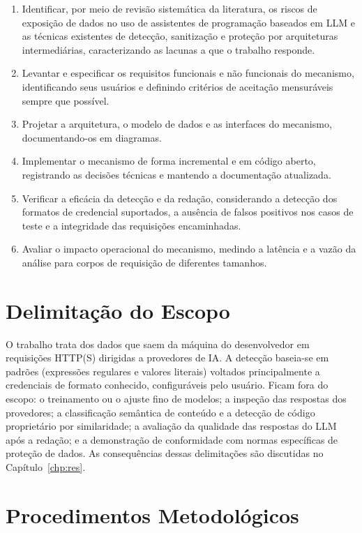 \begin{enumerate}
    \item[\textbf{OE1.}] Identificar, por meio de revisão sistemática da literatura, os riscos de exposição de dados no uso de assistentes de programação baseados em LLM e as técnicas existentes de detecção, sanitização e proteção por arquiteturas intermediárias, caracterizando as lacunas a que o trabalho responde.
    \item[\textbf{OE2.}] Levantar e especificar os requisitos funcionais e não funcionais do mecanismo, identificando seus usuários e definindo critérios de aceitação mensuráveis sempre que possível.
    \item[\textbf{OE3.}] Projetar a arquitetura, o modelo de dados e as interfaces do mecanismo, documentando-os em diagramas.
    \item[\textbf{OE4.}] Implementar o mecanismo de forma incremental e em código aberto, registrando as decisões técnicas e mantendo a documentação atualizada.
    \item[\textbf{OE5.}] Verificar a eficácia da detecção e da redação, considerando a detecção dos formatos de credencial suportados, a ausência de falsos positivos nos casos de teste e a integridade das requisições encaminhadas.
    \item[\textbf{OE6.}] Avaliar o impacto operacional do mecanismo, medindo a latência e a vazão da análise para corpos de requisição de diferentes tamanhos.
\end{enumerate}

\section{Delimitação do Escopo}

O trabalho trata dos dados que saem da máquina do desenvolvedor em requisições HTTP(S) dirigidas a provedores de IA. A detecção baseia-se em padrões (expressões regulares e valores literais) voltados principalmente a credenciais de formato conhecido, configuráveis pelo usuário. Ficam fora do escopo: o treinamento ou o ajuste fino de modelos; a inspeção das respostas dos provedores; a classificação semântica de conteúdo e a detecção de código proprietário por similaridade; a avaliação da qualidade das respostas do LLM após a redação; e a demonstração de conformidade com normas específicas de proteção de dados. As consequências dessas delimitações são discutidas no Capítulo~\ref{chp:res}.

\section{Procedimentos Metodológicos}

